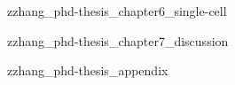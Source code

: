 \documentclass[10pt]{book}
\begin{document}
{zzhang_phd-thesis_chapter6_single-cell}


{zzhang_phd-thesis_chapter7_discussion}


{zzhang_phd-thesis_appendix}


\end{document}
